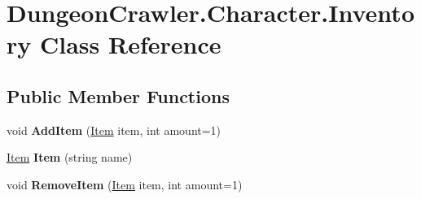 \hypertarget{class_dungeon_crawler_1_1_character_1_1_inventory}{}\section{Dungeon\+Crawler.\+Character.\+Inventory Class Reference}
\label{class_dungeon_crawler_1_1_character_1_1_inventory}
\subsection*{Public Member Functions}
\begin{DoxyCompactItemize}
\item 
\hypertarget{class_dungeon_crawler_1_1_character_1_1_inventory_af5584f56326553ac8150b49f9e631b7d}{}void {\bfseries Add\+Item} (\hyperlink{class_dungeon_crawler_1_1_core_1_1_item}{Item} item, int amount=1)\label{class_dungeon_crawler_1_1_character_1_1_inventory_af5584f56326553ac8150b49f9e631b7d}

\item 
\hypertarget{class_dungeon_crawler_1_1_character_1_1_inventory_a6c885ad8274da8c39787744b44c9bfde}{}\hyperlink{class_dungeon_crawler_1_1_core_1_1_item}{Item} {\bfseries Item} (string name)\label{class_dungeon_crawler_1_1_character_1_1_inventory_a6c885ad8274da8c39787744b44c9bfde}

\item 
\hypertarget{class_dungeon_crawler_1_1_character_1_1_inventory_a3fb85209eba0aca801458a6b690679bc}{}void {\bfseries Remove\+Item} (\hyperlink{class_dungeon_crawler_1_1_core_1_1_item}{Item} item, int amount=1)\label{class_dungeon_crawler_1_1_character_1_1_inventory_a3fb85209eba0aca801458a6b690679bc}

\end{DoxyCompactItemize}
